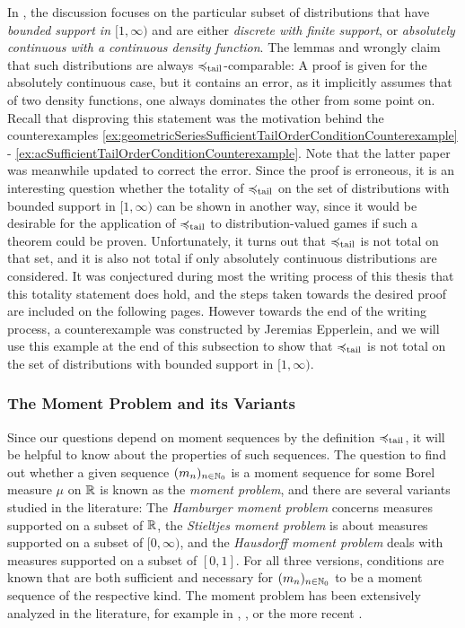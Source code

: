 \documentclass[a4paper,DIV=11]{scrreprt}
\theoremstyle{definition}
\begin{document}
    In \cite{bib:rassGameRiskManagI,bib:rassTotalOrderingOnLossDistributions}, the discussion focuses on the particular subset of distributions that have \emph{bounded support in $[1, \infty)$} and are either \emph{discrete with finite support}, or \emph{absolutely continuous with a continuous density function}.
    The lemmas \cite[Lemma 2]{bib:rassTotalOrderingOnLossDistributions} and \cite[Lemma 2.4]{bib:rassGameRiskManagI} wrongly claim that such distributions are always $\preccurlyeq_{\text{tail}}$-comparable: A proof is given for the absolutely continuous case, but it contains an error, as it implicitly assumes that of two density functions, one always dominates the other from some point on. Recall that disproving this statement was the motivation behind the counterexamples \ref{ex:geometricSeriesSufficientTailOrderConditionCounterexample} - \ref{ex:acSufficientTailOrderConditionCounterexample}. Note that the latter paper was meanwhile updated to correct the error.
    Since the proof is erroneous, it is an interesting question whether the totality of $\preccurlyeq_{\text{tail}}$ on the set of distributions with bounded support in $[1, \infty)$ can be shown in another way, since it would be desirable for the application of $\preccurlyeq_{\text{tail}}$ to distribution-valued games if such a theorem could be proven.
    Unfortunately, it turns out that $\preccurlyeq_{\text{tail}}$ is not total on that set, and it is also not total if only absolutely continuous distributions are considered.
    It was conjectured during most the writing process of this thesis that this totality statement does hold, and the steps taken towards the desired proof are included on the following pages. However towards the end of the writing process, a counterexample was constructed by Jeremias Epperlein, and we will use this example at the end of this subsection to show that $\preccurlyeq_{\text{tail}}$ is not total on the set of distributions with bounded support in $[1, \infty)$.
    
    \subsubsection{The Moment Problem and its Variants}
    Since our questions depend on moment sequences by the definition $\preccurlyeq_{\text{tail}}$, it will be helpful to know about the properties of such sequences.
    The question to find out whether a given sequence $(m_n)_{n \in \mathbb{N}_0}$ is a moment sequence for some Borel measure $\mu$ on $\mathbb{R}$ is known as the \emph{moment problem}, and there are several variants studied in the literature:
    The \emph{Hamburger moment problem} concerns measures supported on a subset of $\mathbb{R}$, the \emph{Stieltjes moment problem} is about measures supported on a subset of $[0, \infty)$,
    and the \emph{Hausdorff moment problem} deals with measures supported on a subset of $[0, 1]$. For all three versions, conditions are known that are both sufficient and necessary for $(m_n)_{n \in \mathbb{N}_0}$ to be a moment sequence of the respective kind.
    The moment problem has been extensively analyzed in the literature, for example in \cite{bib:shohatTheProblemOfMoments}, \cite{bib:akhiezerClassicalMomentProblem}, or the more recent \cite{bib:schmuedgenTheMomentProblem}.
\end{document}

